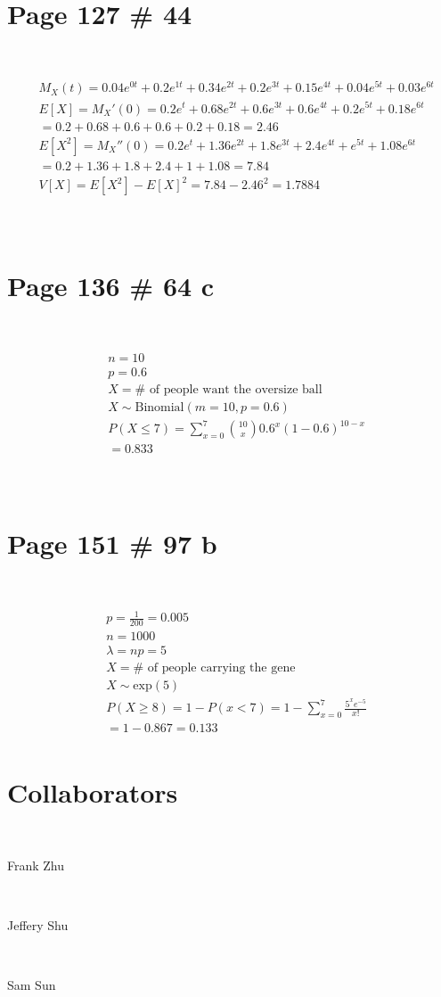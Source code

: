 \documentclass{article}
\begin{document}
~

\section*{Page 127 \# 44}

~

\begin{align*}
    &M_X(t)=0.04e^{0t}+0.2e^{1t}+0.34e^{2t}+0.2e^{3t}+0.15e^{4t}+0.04e^{5t}+0.03e^{6t}\\
    &E[X]={M_X}'(0)=0.2e^t+0.68e^{2t}+0.6e^{3t}+0.6e^{4t}+0.2e^{5t}+0.18e^{6t}\\
    &=0.2+0.68+0.6+0.6+0.2+0.18=2.46\\
    &E[X^2]={M_X}''(0)=0.2e^t+1.36e^{2t}+1.8e^{3t}+2.4e^{4t}+e^{5t}+1.08e^{6t}\\
    &=0.2+1.36+1.8+2.4+1+1.08=7.84\\
    &V[X]=E[X^2]-{E[X]}^2=7.84-2.46^2=1.7884\\
\end{align*}

~

\section*{Page 136 \# 64 c}

~

\begin{align*}
    &n=10\\
    &p=0.6\\
    &X=\# \text{ of people want the oversize ball}\\
    &X\sim \text{Binomial}(m=10,p=0.6)\\
    &P(X\leqslant 7)=\sum_{x=0}^{7}\binom{10}{x}0.6^x(1-0.6)^{10-x}\\
    &=0.833\\
\end{align*}

~

\section*{Page 151 \# 97 b}

~

\begin{align*}
    &p=\frac{1}{200}=0.005\\
    &n=1000\\
    &\lambda =np=5\\
    &X=\# \text{ of people carrying the gene}\\
    &X\sim \text{exp}(5)\\
    &P(X\geqslant 8)=1-P(x<7)=1-\sum_{x=0}^{7}\frac{5^xe^{-5}}{x!}\\
    &=1-0.867=0.133\\
\end{align*}

\newpage

\section*{Collaborators}

~

Frank Zhu

~

Jeffery Shu

~

Sam Sun
\end{document}
